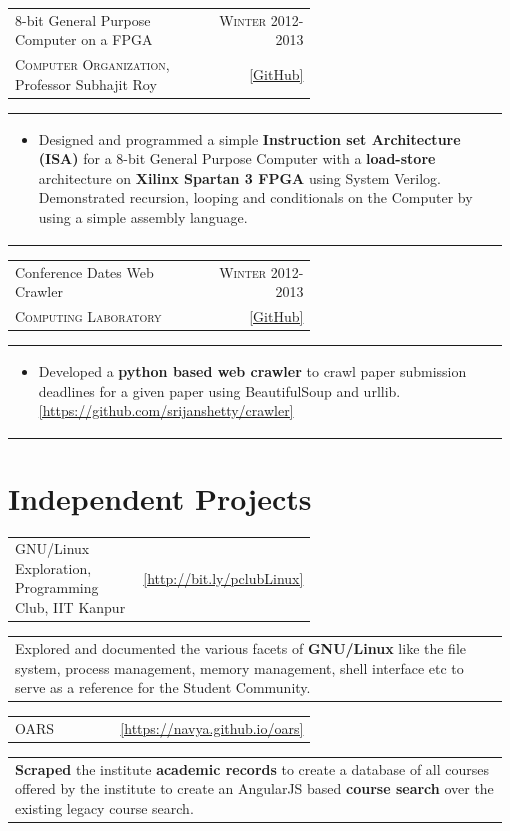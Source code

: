 \documentclass[a4paper]{article} %
\newcommand{\cproject}[5]{
    \begin{tabular}{p{0.60\linewidth}r}
        \textcolor{NavyBlue}{\small #2} & \multicolumn{1}{m{7.3cm}}{\raggedleft \small {\textsc{#1}}}\\
        \small {#3} & \small {#4}
    \end{tabular}
    \begin{tabular}{p{0.98\linewidth}}
    \vspace{-0.3cm}
        \footnotesize {#5}
    \end{tabular}
    \vspace{-0.45cm}
}
\newcommand{\gitproject}[3]{
    \begin{tabular}{p{0.60\linewidth}r}
        \textcolor{NavyBlue}{\small #2} & \multicolumn{1}{m{7.3cm}}{\raggedleft #1}\\
    \end{tabular}
    \begin{tabular}{p{0.98\linewidth}}
    \vspace{-0.3cm}
        \footnotesize{#3}
    \end{tabular}
    \vspace{-0.6cm}
}
\begin{document}
\cproject
    {Winter 2012-2013}
    {8-bit General Purpose Computer on a FPGA}
    {\textsc{Computer Organization}, Professor Subhajit Roy}
    { \href{https://github.com/srijanshetty/220\_y11} {[GitHub]} }
    {
      \begin{itemize}[leftmargin=0.5cm]
          \item Designed and programmed a simple \textbf{Instruction set Architecture (ISA)} for a 8-bit General
              Purpose Computer with a \textbf{load-store}
              architecture on \textbf{Xilinx Spartan 3 FPGA} using System Verilog.  Demonstrated recursion, looping
              and conditionals on the Computer by using a simple assembly language.
      \end{itemize}
    }

\cproject
    {Winter 2012-2013}
    {Conference Dates Web Crawler}
    {\textsc{Computing Laboratory}}
    {\href{https://github.com/srijanshetty/crawler} { [GitHub] } }
    {
      \begin{itemize}[leftmargin=0.5cm]
          \item Developed a \textbf{python based web crawler} to crawl paper submission deadlines for a given paper
              using BeautifulSoup and urllib.
              \href{https://github.com/srijanshetty/crawler} { [https://github.com/srijanshetty/crawler] }
      \end{itemize}
    }

\section{Independent Projects}

\gitproject
    {\href{http://bit.ly/pclubLinux}{\footnotesize{[http://bit.ly/pclubLinux]}}}
    {GNU/Linux Exploration, Programming Club, IIT Kanpur}
    {
        Explored and documented the various facets of \textbf{GNU/Linux} like the file system,
        process management, memory management, shell interface etc to serve as a reference for the
        Student Community.
    }
\vspace{3mm}

\gitproject
    {\href{https://navya.github.io/oars}{\footnotesize{[https://navya.github.io/oars]}}}
    {OARS}
    {
        \textbf{Scraped} the institute \textbf{academic records} to create a database of all courses offered by the
        institute to create an AngularJS based \textbf{course search} over the existing legacy course search.
    }
\vspace{3mm}
\end{document}
